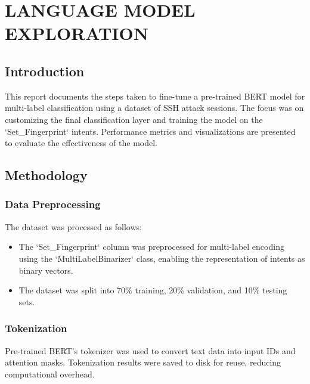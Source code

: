 

\section{LANGUAGE MODEL EXPLORATION}

\subsection*{Introduction}
This report documents the steps taken to fine-tune a pre-trained BERT model for multi-label classification using a dataset of SSH attack sessions. The focus was on customizing the final classification layer and training the model on the `Set\_Fingerprint` intents. Performance metrics and visualizations are presented to evaluate the effectiveness of the model.

\subsection*{Methodology}

\subsubsection*{Data Preprocessing}
The dataset was processed as follows:
\begin{itemize}
    \item The `Set\_Fingerprint` column was preprocessed for multi-label encoding using the `MultiLabelBinarizer` class, enabling the representation of intents as binary vectors.
    \item The dataset was split into 70\% training, 20\% validation, and 10\% testing sets.
\end{itemize}

\subsubsection*{Tokenization}
Pre-trained BERT's tokenizer was used to convert text data into input IDs and attention masks. Tokenization results were saved to disk for reuse, reducing computational overhead.

